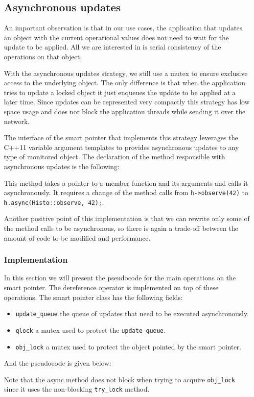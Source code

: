 \subsection*{Asynchronous updates}

An important observation is that in our use cases, the application that updates an object with the current operational values does not need to wait for the update to be applied. All we are interested in is serial consistency of the operations on that object. 

With the asynchronous updates strategy, we still use a mutex to ensure exclusive access to the underlying object. The only difference is that when the application tries to update a locked object it just enqueues the update to be applied at a later time. Since updates can be represented very compactly this strategy has low space usage and does not block the application threads while sending it over the network.

The interface of the smart pointer that implements this strategy leverages the C++11 variable argument templates to provides asynchronous updates to any type of monitored object. The declaration of the method responsible with asynchronous updates is the following:


This method takes a pointer to a member function and its arguments and calls it asynchronously. It requires a change of the method calls from \verb+h->observe(42)+ to \verb+h.async(Histo::observe, 42);+.

Another positive point of this implementation is that we can rewrite only some of the method calls to be asynchronous, so there is again a trade-off between the amount of code to be modified and performance.

\subsubsection*{Implementation}

In this section we will present the pseudocode for the main operations on the smart pointer. The dereference operator is implemented on top of these operations. The smart pointer class has the following fields:
\begin{itemize}
\item {\tt update\_queue} the queue of updates that need to be executed asynchronously.
\item {\tt qlock} a mutex used to protect the {\tt update\_queue}.
\item {\tt obj\_lock} a mutex used to protect the object pointed by the smart pointer.
\end{itemize}
And the pseudocode is given below:

Note that the async method does not block when trying to acquire {\tt obj\_lock} since it uses the non-blocking {\tt try\_lock} method. 

